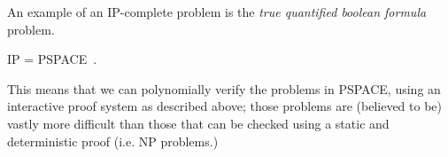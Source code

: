 An example of an IP-complete problem is the \emph{true quantified boolean formula} problem.

\begin{theorem}
 IP = PSPACE~\cite{ipequalspspace}.
\end{theorem}

This means that we can polynomially verify the problems in PSPACE, using an interactive proof system as described above; those problems are (believed to be) vastly more difficult than those that can be checked using a static and deterministic proof (i.e. NP problems.)


